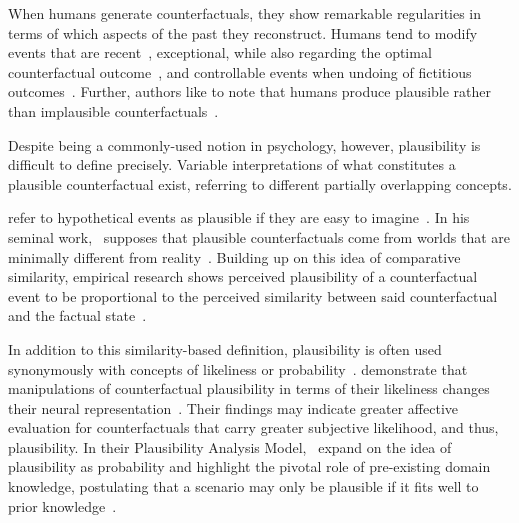 When humans generate counterfactuals, they show remarkable regularities in terms of which aspects of the past they reconstruct. 
Humans tend to modify events that are recent~\citep{miller_temporal_1990, byrne_temporality_2000}, exceptional, while also regarding the optimal counterfactual outcome~\citep{kahneman_simulation_1982, dixon_if_2011}, and 
controllable events when undoing of fictitious outcomes~\citep{girotto_event_1991}.
Further, authors like to note that humans produce plausible rather than implausible counterfactuals~\citep{byrne_counterfactual_2016, de_brigard_coming_2013}.

Despite being a commonly-used notion in psychology, however, plausibility is difficult to define precisely.
Variable interpretations of what constitutes a plausible counterfactual exist, referring to different partially overlapping concepts.

\citeauthor{kahneman_simulation_1982} refer to hypothetical events as plausible if they are easy to imagine~\citep{kahneman_simulation_1982}. 
In his seminal work,~\citeauthor{lewis_counterfactuals_1973} supposes that plausible counterfactuals come from worlds that are minimally different from reality~\citep{lewis_counterfactuals_1973}. 
Building up on this idea of comparative similarity, empirical research shows perceived plausibility of a counterfactual event to be proportional to the perceived similarity between said counterfactual and the factual state~\citep{stanley_counterfactual_2017, de_brigard_perceived_2021}.

In addition to this similarity-based definition, plausibility is often used synonymously with concepts of likeliness or probability~\citep{pezdek_is_2006, de_brigard_remembering_2013}. 
\citeauthor{de_brigard_remembering_2013} demonstrate that manipulations of counterfactual plausibility in terms of their likeliness changes their neural representation~\citep{de_brigard_remembering_2013}.
Their findings may indicate greater affective evaluation for counterfactuals that carry greater subjective likelihood, and thus, plausibility.
In their Plausibility Analysis Model,~\citeauthor{connell_model_2006} expand on the idea of plausibility as probability and highlight the pivotal role of pre-existing domain knowledge, postulating that a scenario may only be plausible if it fits well to prior knowledge~\citep{connell_model_2006}.

